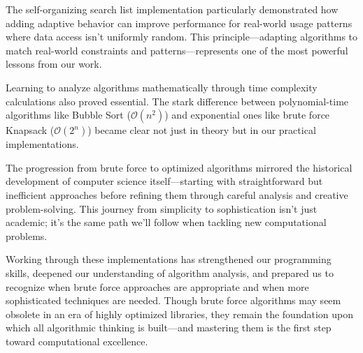 \documentclass{article}
\begin{document}
The self-organizing search list implementation particularly demonstrated how adding adaptive behavior can improve performance for real-world usage patterns where data access isn't uniformly random. This principle—adapting algorithms to match real-world constraints and patterns—represents one of the most powerful lessons from our work.

Learning to analyze algorithms mathematically through time complexity calculations also proved essential. The stark difference between polynomial-time algorithms like Bubble Sort ($\mathcal{O}(n^2)$) and exponential ones like brute force Knapsack ($\mathcal{O}(2^n)$) became clear not just in theory but in our practical implementations.

The progression from brute force to optimized algorithms mirrored the historical development of computer science itself—starting with straightforward but inefficient approaches before refining them through careful analysis and creative problem-solving. This journey from simplicity to sophistication isn't just academic; it's the same path we'll follow when tackling new computational problems.

Working through these implementations has strengthened our programming skills, deepened our understanding of algorithm analysis, and prepared us to recognize when brute force approaches are appropriate and when more sophisticated techniques are needed. Though brute force algorithms may seem obsolete in an era of highly optimized libraries, they remain the foundation upon which all algorithmic thinking is built—and mastering them is the first step toward computational excellence.
\end{document}
